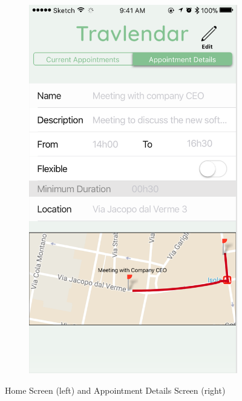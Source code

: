 \documentclass[12pt]{article}
\begin{document}
\begin{figure}[H]
\begin{subfigure}{.4\textwidth}
        \includegraphics[scale=0.32]{interfaceAppointment.png}
        \label{fig:newAppointmentScreen}
    \end{subfigure}
    \caption{Home Screen (left) and Appointment Details Screen (right)}
\end{figure}
\end{document}
